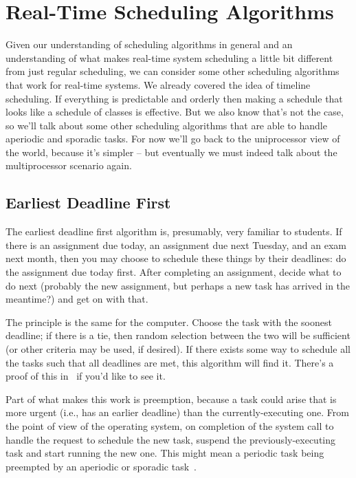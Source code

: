 




\section*{Real-Time Scheduling Algorithms}

Given our understanding of scheduling algorithms in general and an understanding of what makes real-time system scheduling a little bit different from just regular scheduling, we can consider some other scheduling algorithms that work for real-time systems. We already covered the idea of timeline scheduling. If everything is predictable and orderly then making a schedule that looks like a schedule of classes is effective. But we also know that's not the case, so we'll talk about some other scheduling algorithms that are able to handle aperiodic and sporadic tasks. For now we'll go back to the uniprocessor view of the world, because it's simpler -- but eventually we must indeed talk about the multiprocessor scenario again.

\subsection*{Earliest Deadline First}

The earliest deadline first algorithm is, presumably, very familiar to students. If there is an assignment due today, an assignment due next Tuesday, and an exam next month, then you may choose to schedule these things by their deadlines: do the assignment due today first. After completing an assignment, decide what to do next (probably the new assignment, but perhaps a new task has arrived in the meantime?) and get on with that.

The principle is the same for the computer. Choose the task with the soonest deadline; if there is a tie, then random selection between the two will be sufficient (or other criteria may be used, if desired). If there exists some way to schedule all the tasks such that all deadlines are met, this algorithm will find it. There's a proof of this in~\cite{mte241} if you'd like to see it.

Part of what makes this work is preemption, because a task could arise that is more urgent (i.e., has an earlier deadline) than the currently-executing one. From the point of view of the operating system, on completion of the system call to handle the request to schedule the new task, suspend the previously-executing task and start running the new one. This might mean a periodic task being preempted by an aperiodic or sporadic task~\cite{mte241}.


